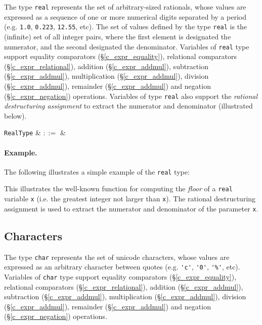 The type \lstinline{real} represents the set of arbitrary-sized rationals, whose values are expressed as a sequence of one or more numerical digits separated by a period (e.g. \lstinline{1.0}, \lstinline{0.223}, \lstinline{12.55}, etc).  The set of values defined by the type \lstinline{real} is the (infinite) set of all integer pairs, where the first element is designated the numerator, and the second designated the denominator.  Variables of \lstinline{real} type support equality comparators (\S\ref{c_expr_equality}), relational comparators (\S\ref{c_expr_relational}), addition (\S\ref{c_expr_addmul}), subtraction (\S\ref{c_expr_addmul}), multiplication (\S\ref{c_expr_addmul}), division (\S\ref{c_expr_addmul}), remainder (\S\ref{c_expr_addmul}) and negation (\S\ref{c_expr_negation}) operations.  Variables of type \lstinline{real} also support the {\em rational destructuring assignment} to extract the numerator and denominator (illustrated below).

\begin{syntax}
  \verb+RealType+ & $::=$ &  \\
\end{syntax}

\paragraph{Example.} The following illustrates a simple example of the \lstinline{real} type:



This illustrates the well-known function for computing the {\em floor} of a \lstinline{real} variable \lstinline{x} (i.e. the greatest integer not larger than \lstinline{x}).  The rational destructuring assignment is used to extract the numerator and denominator of the parameter \lstinline{x}.


\subsection{Characters}
\label{c_types_char}

The type \lstinline{char} represents the set of unicode characters, whose values are expressed as an arbitrary character between quotes (e.g. \lstinline{'c'}, \lstinline{'0'}, \lstinline{'%'}, etc).  Variables of \lstinline{char} type support equality comparators (\S\ref{c_expr_equality}), relational comparators (\S\ref{c_expr_relational}), addition (\S\ref{c_expr_addmul}), subtraction (\S\ref{c_expr_addmul}), multiplication (\S\ref{c_expr_addmul}), division (\S\ref{c_expr_addmul}), remainder (\S\ref{c_expr_addmul}) and negation (\S\ref{c_expr_negation}) operations. 

